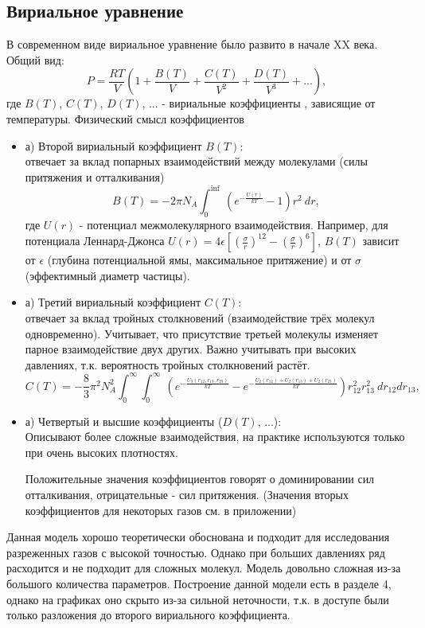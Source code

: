 \documentclass[a4paper]{article}
\numberwithin{equation}{subsection} %
\begin{document}
\subsection{Вириальное уравнение}
В современном виде вириальное уравнение было развито в начале XX века. Общий вид:
\begin{equation}
      P = \frac{RT}{V}(1 + \frac{B(T)}{V} + \frac{C(T)}{V^2} + \frac{D(T)}{V^3} + . . .),
\tag{\thesubsection}
\end{equation}
где $B(T)$, $C(T)$, $D(T)$, ... - вириальные коэффициенты , зависящие от температуры.
Физический смысл коэффициентов 
\begin{itemize}
\item а) Второй вириальный коэффициент $B(T)$:\\
отвечает за вклад попарных взаимодействий между молекулами (силы притяжения и отталкивания)
\begin{equation*}
      B(T) = -2\pi N_A \displaystyle \int_0^{\inf} \ (e^{-\frac{U(r)}{kT}} - 1)r^2\ dr,
\end{equation*}
где $U(r)$ - потенциал межмолекулярного взаимодействия. Например, для потенциала Леннард-Джонса $U(r) = 4 \epsilon \left [ \left( \frac{\sigma}{r}\right )^{12} - \left( \frac{\sigma}{r}\right )^{6} \right ]$, $B(T)$ зависит от $\epsilon$ (глубина потенциальной ямы, максимальное притяжение) и от $\sigma$ (эффектимный диаметр частицы).
\item а) Третий вириальный коэффициент $C(T)$:\\
отвечает за вклад тройных столкновений (взаимодействие трёх молекул одновременно). Учитывает, что присутствие третьей молекулы изменяет парное взаимодействие двух других. Важно учитывать при высоких давлениях, т.к. вероятность тройных столкновений растёт.
\begin{equation*}
      C(T) = -\frac{8}{3}\pi^2 N_A^2 \displaystyle \int_0^{\infty} \displaystyle \int_0^{\infty} \ \left(e^{-\frac{U_3(r_{12}, r_{13}, r_{23})}{kT}} - e^{-\frac{U_2(r_{12}) + U_2(r_{13}) + U_2(r_{23})}{kT}}\right)r_{12}^2r_{13}^2\ dr_{12} dr_{13},
\end{equation*}
\item а) Четвертый и высшие коэффициенты ($D(T)$, ...):\\
Описывают более сложные взаимодействия, на практике используются только при очень высоких плотностях. 

Положительные значения коэффициентов говорят о доминировании сил отталкивания, отрицательные - сил притяжения. (Значения вторых коэффициентов для некоторых газов см. в приложении)
\end{itemize}
Данная модель хорошо теоретически обоснована и подходит для исследования разреженных газов с высокой точностью. Однако при больших давлениях ряд расходится и не подходит для сложных молекул. Модель довольно сложная из-за большого количества параметров. Построение данной модели есть в разделе 4, однако на графиках оно скрыто из-за сильной неточности, т.к. в доступе были только разложения до второго вириального коэффициента.
\end{document}
